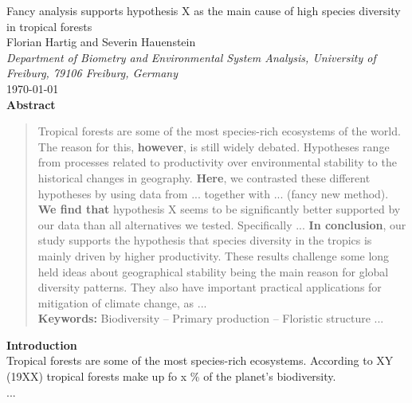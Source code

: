 \documentclass{tufte-book}
\begin{document}
\begin{center}
	\huge{Fancy analysis supports hypothesis X as the main cause of high species diversity in tropical forests} \\ 
	\vspace{0.3em}
	\large{Florian Hartig and Severin Hauenstein}\\
	\vspace{0.3em}
	\small{\textit{Department of Biometry and Environmental System Analysis, University of Freiburg, 79106 Freiburg, Germany}}\\
	\vspace{1em}
	\large{\today}\\
	\vspace{2em}
	\textbf{Abstract}\\ 
\end{center}
\begin{quote}
Tropical forests are some of the most species-rich ecosystems of the world.
The reason for this, \textbf{however}, is still widely debated. Hypotheses range from processes related to productivity over environmental stability to the historical changes in geography.
\textbf{Here}, we contrasted these different hypotheses by using data from ... together with ... (fancy new method).
\textbf{We find that} hypothesis X seems to be significantly better supported by our data
than all alternatives we tested. Specifically ... 
\textbf{In conclusion}, our study supports the hypothesis that species diversity in the
tropics is mainly driven by higher productivity. These results challenge some long held
ideas about geographical stability being the main reason for global diversity
patterns. They also have important practical applications for mitigation of climate
change, as ...\\[0.3cm]
\noindent\textbf{Keywords:} Biodiversity -- Primary production -- Floristic structure ...\\
\end{quote}

\noindent\textbf{Introduction}\\
Tropical forests are some of the most species-rich ecosystems. According to XY (19XX) tropical forests make up fo x \% of the planet's biodiversity.\\
...
\end{document}
